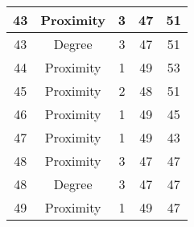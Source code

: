 \documentclass[results.tex]{subfiles}
\begin{document}
\begin{center}
\begin{tabular}{| c || c | c | c | c |}
            \hline
            43                      & Proximity                    & 3                      & 47                      & 51                   \\
            \hline
            43                      & Degree                       & 3                      & 47                      & 51                   \\
            \hline
            44                      & Proximity                    & 1                      & 49                      & 53                   \\
            \hline
            45                      & Proximity                    & 2                      & 48                      & 51                   \\
            \hline
            46                      & Proximity                    & 1                      & 49                      & 45                   \\
            \hline
            47                      & Proximity                    & 1                      & 49                      & 43                   \\
            \hline
            48                      & Proximity                    & 3                      & 47                      & 47                   \\
            \hline
            48                      & Degree                       & 3                      & 47                      & 47                   \\
            \hline
            49                      & Proximity                    & 1                      & 49                      & 47                   \\
            \hline
        \end{tabular}
    \end{center}
\end{document}
